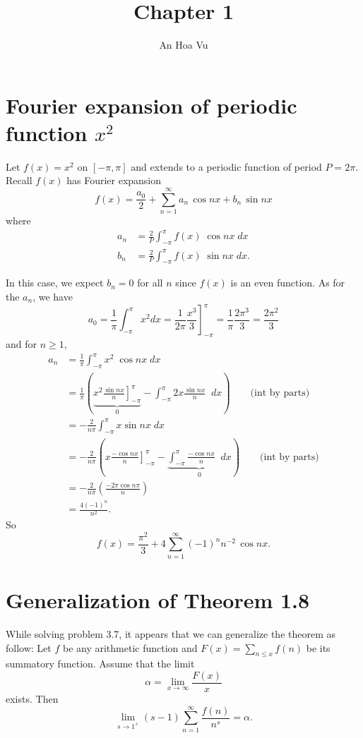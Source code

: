 \documentclass{article}
\title{Chapter 1}
\author{An Hoa Vu}
\begin{document}
\maketitle

\section{Fourier expansion of periodic function $x^2$}

Let $f(x) = x^2$ on $[-\pi, \pi]$ and extends to a periodic function of period $P = 2\pi$. Recall $f(x)$ has Fourier expansion
$$f(x) = \frac{a_0}{2} + \sum_{n = 1}^{\infty} a_n \, \cos nx + b_n \, \sin nx$$
where
\begin{align*}
a_n &= \frac{2}{P} \int_{-\pi}^{\pi} f(x) \; \cos nx \; dx\\
b_n &= \frac{2}{P} \int_{-\pi}^{\pi} f(x) \; \sin nx \; dx.
\end{align*}

In this case, we expect $b_n = 0$ for all $n$ since $f(x)$ is an even function. As for the $a_n$, we have
$$a_0 = \frac{1}{\pi} \int_{-\pi}^{\pi} x^2 dx = \frac{1}{2\pi} \left. \frac{x^3}{3} \right]_{-\pi}^{\pi} = \frac{1}{\pi} \frac{2\pi^3}{3} = \frac{2\pi^2}{3}$$
and for $n \geq 1$,
\begin{align*}
a_n &= \frac{1}{\pi} \int_{-\pi}^{\pi} x^2 \; \cos nx \; dx\\
&= \frac{1}{\pi} \left( \underbrace{\left. x^2 \frac{\sin nx}{n} \right]_{-\pi}^{\pi}}_{0} - \int_{-\pi}^{\pi} 2x  \frac{\sin nx}{n} \;  \; dx \right) \qquad \text{(int by parts)}\\
&= -\frac{2}{n \pi} \int_{-\pi}^{\pi} x  \sin nx \; dx\\
&=  -\frac{2}{n \pi} \left( \left. x \frac{-\cos nx}{n} \right]_{-\pi}^{\pi} - \underbrace{\int_{-\pi}^{\pi} \frac{-\cos nx}{n} \;  \; dx}_{0} \right) \qquad \text{(int by parts)}\\
&= -\frac{2}{n \pi} \left( \frac{- 2 \pi \cos n\pi}{n} \right)\\
&= \frac{4 (-1)^n}{n^2}.
\end{align*}
So
$$f(x) = \frac{\pi^2}{3} + 4 \sum_{n = 1}^{\infty} (-1)^n n^{-2} \, \cos nx.$$

\section{Generalization of Theorem 1.8}

While solving problem 3.7, it appears that we can generalize the theorem as follow: Let $f$ be any arithmetic function and $F(x) = \sum_{n \leq x} f(n)$ be its summatory function. Assume that the limit
$$\alpha = \lim_{x \rightarrow \infty} \frac{F(x)}{x}$$
exists. Then
$$\lim_{s \rightarrow 1^+} (s - 1) \sum_{n = 1}^{\infty} \frac{f(n)}{n^s} = \alpha.$$
\end{document}
